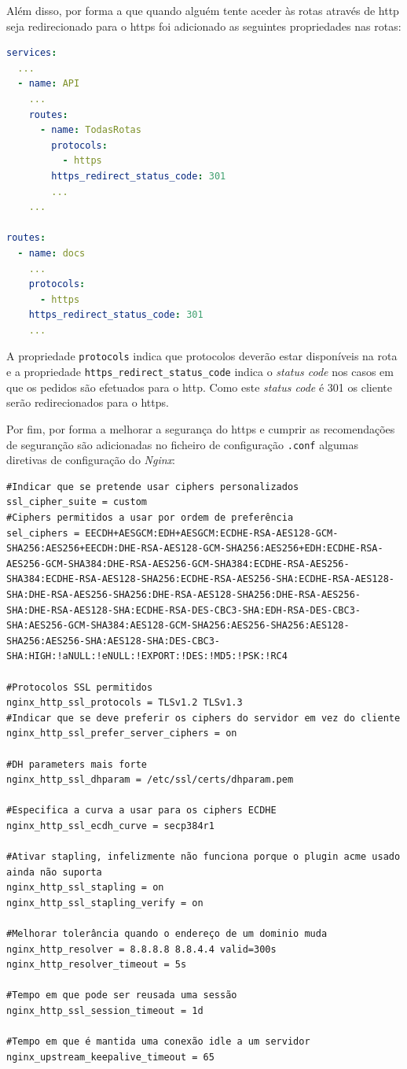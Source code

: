 Além disso, por forma a que quando alguém tente aceder às rotas através de \acrshort{http} seja redirecionado para o \acrshort{https} foi adicionado as seguintes propriedades nas rotas:
\begin{lstlisting}[language=yaml, caption=Configuração declarativa do \textit{Kong}: Serviço para a geração de certificados \acrshort{tls}]
services:
  ...
  - name: API
    ...
    routes:
      - name: TodasRotas
        protocols:
          - https
        https_redirect_status_code: 301
        ...
    ...

routes:
  - name: docs
    ...
    protocols:
      - https
    https_redirect_status_code: 301
    ...
\end{lstlisting}
A propriedade \texttt{protocols} indica que protocolos deverão estar disponíveis na rota e a propriedade \texttt{https\_redirect\_status\_code} indica o \textit{status code} nos casos em que os pedidos são efetuados para o \acrshort{http}. Como este \textit{status code} é 301 os cliente serão redirecionados para o \acrshort{https}.

Por fim, por forma a melhorar a segurança do \acrshort{https} e cumprir as recomendações de seguranção são adicionadas no ficheiro de configuração \texttt{.conf} algumas diretivas de configuração do \textit{Nginx}:
\begin{lstlisting}[caption=Configurações do \textit{Nginx} no ficheiro de configuração \texttt{.conf}]
#Indicar que se pretende usar ciphers personalizados
ssl_cipher_suite = custom
#Ciphers permitidos a usar por ordem de preferência
sel_ciphers = EECDH+AESGCM:EDH+AESGCM:ECDHE-RSA-AES128-GCM-SHA256:AES256+EECDH:DHE-RSA-AES128-GCM-SHA256:AES256+EDH:ECDHE-RSA-AES256-GCM-SHA384:DHE-RSA-AES256-GCM-SHA384:ECDHE-RSA-AES256-SHA384:ECDHE-RSA-AES128-SHA256:ECDHE-RSA-AES256-SHA:ECDHE-RSA-AES128-SHA:DHE-RSA-AES256-SHA256:DHE-RSA-AES128-SHA256:DHE-RSA-AES256-SHA:DHE-RSA-AES128-SHA:ECDHE-RSA-DES-CBC3-SHA:EDH-RSA-DES-CBC3-SHA:AES256-GCM-SHA384:AES128-GCM-SHA256:AES256-SHA256:AES128-SHA256:AES256-SHA:AES128-SHA:DES-CBC3-SHA:HIGH:!aNULL:!eNULL:!EXPORT:!DES:!MD5:!PSK:!RC4

#Protocolos SSL permitidos
nginx_http_ssl_protocols = TLSv1.2 TLSv1.3
#Indicar que se deve preferir os ciphers do servidor em vez do cliente
nginx_http_ssl_prefer_server_ciphers = on

#DH parameters mais forte
nginx_http_ssl_dhparam = /etc/ssl/certs/dhparam.pem

#Especifica a curva a usar para os ciphers ECDHE
nginx_http_ssl_ecdh_curve = secp384r1

#Ativar stapling, infelizmente não funciona porque o plugin acme usado ainda não suporta
nginx_http_ssl_stapling = on
nginx_http_ssl_stapling_verify = on

#Melhorar tolerância quando o endereço de um dominio muda
nginx_http_resolver = 8.8.8.8 8.8.4.4 valid=300s
nginx_http_resolver_timeout = 5s

#Tempo em que pode ser reusada uma sessão
nginx_http_ssl_session_timeout = 1d

#Tempo em que é mantida uma conexão idle a um servidor
nginx_upstream_keepalive_timeout = 65
\end{lstlisting}

